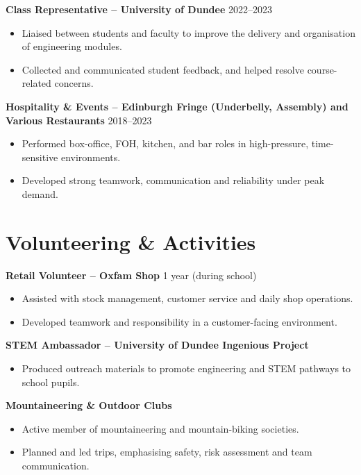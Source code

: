 \documentclass[a4paper,11pt]{article}
\begin{document}
\textbf{Class Representative – University of Dundee} \hfill 2022--2023
\begin{itemize}
    \item Liaised between students and faculty to improve the delivery and organisation of engineering modules.
    \item Collected and communicated student feedback, and helped resolve course-related concerns.
\end{itemize}

\textbf{Hospitality \& Events – Edinburgh Fringe (Underbelly, Assembly) and Various Restaurants} \hfill 2018--2023
\begin{itemize}
    \item Performed box-office, FOH, kitchen, and bar roles in high-pressure, time-sensitive environments.
    \item Developed strong teamwork, communication and reliability under peak demand.
\end{itemize}


\section*{Volunteering \& Activities}

\textbf{Retail Volunteer – Oxfam Shop} \hfill 1 year (during school)
\begin{itemize}
    \item Assisted with stock management, customer service and daily shop operations.
    \item Developed teamwork and responsibility in a customer-facing environment.
\end{itemize}

\textbf{STEM Ambassador – University of Dundee Ingenious Project}
\begin{itemize}
    \item Produced outreach materials to promote engineering and STEM pathways to school pupils.
\end{itemize}

\textbf{Mountaineering \& Outdoor Clubs}
\begin{itemize}
    \item Active member of mountaineering and mountain-biking societies.
    \item Planned and led trips, emphasising safety, risk assessment and team communication.
\end{itemize}
\end{document}
